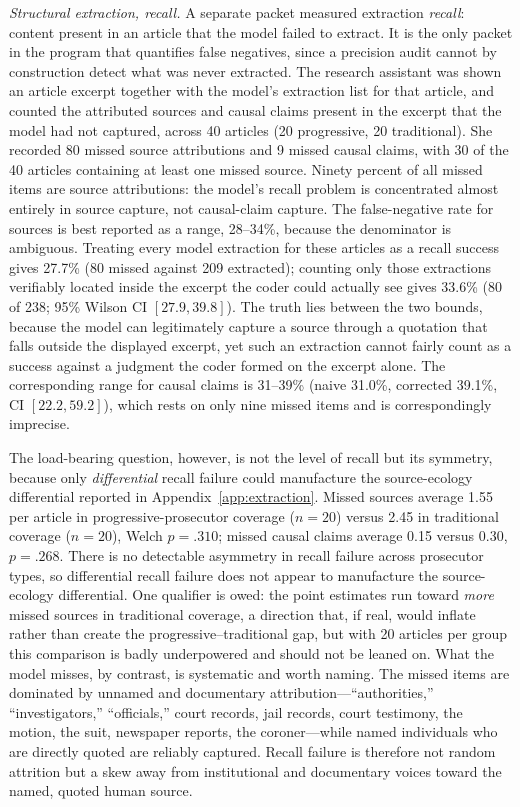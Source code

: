 \documentclass[12pt, letterpaper]{article}
\begin{document}
\emph{Structural extraction, recall.} A separate packet measured extraction \emph{recall}: content present in an article that the model failed to extract. It is the only packet in the program that quantifies false negatives, since a precision audit cannot by construction detect what was never extracted. The research assistant was shown an article excerpt together with the model's extraction list for that article, and counted the attributed sources and causal claims present in the excerpt that the model had not captured, across 40 articles (20 progressive, 20 traditional). She recorded 80 missed source attributions and 9 missed causal claims, with 30 of the 40 articles containing at least one missed source. Ninety percent of all missed items are source attributions: the model's recall problem is concentrated almost entirely in source capture, not causal-claim capture. The false-negative rate for sources is best reported as a range, 28--34\%, because the denominator is ambiguous. Treating every model extraction for these articles as a recall success gives 27.7\% (80 missed against 209 extracted); counting only those extractions verifiably located inside the excerpt the coder could actually see gives 33.6\% (80 of 238; 95\% Wilson CI $[27.9, 39.8]$). The truth lies between the two bounds, because the model can legitimately capture a source through a quotation that falls outside the displayed excerpt, yet such an extraction cannot fairly count as a success against a judgment the coder formed on the excerpt alone. The corresponding range for causal claims is 31--39\% (naive 31.0\%, corrected 39.1\%, CI $[22.2, 59.2]$), which rests on only nine missed items and is correspondingly imprecise.

The load-bearing question, however, is not the level of recall but its symmetry, because only \emph{differential} recall failure could manufacture the source-ecology differential reported in Appendix~\ref{app:extraction}. Missed sources average 1.55 per article in progressive-prosecutor coverage ($n = 20$) versus 2.45 in traditional coverage ($n = 20$), Welch $p = .310$; missed causal claims average 0.15 versus 0.30, $p = .268$. There is no detectable asymmetry in recall failure across prosecutor types, so differential recall failure does not appear to manufacture the source-ecology differential. One qualifier is owed: the point estimates run toward \emph{more} missed sources in traditional coverage, a direction that, if real, would inflate rather than create the progressive--traditional gap, but with 20 articles per group this comparison is badly underpowered and should not be leaned on. What the model misses, by contrast, is systematic and worth naming. The missed items are dominated by unnamed and documentary attribution---``authorities,'' ``investigators,'' ``officials,'' court records, jail records, court testimony, the motion, the suit, newspaper reports, the coroner---while named individuals who are directly quoted are reliably captured. Recall failure is therefore not random attrition but a skew away from institutional and documentary voices toward the named, quoted human source.
\end{document}
